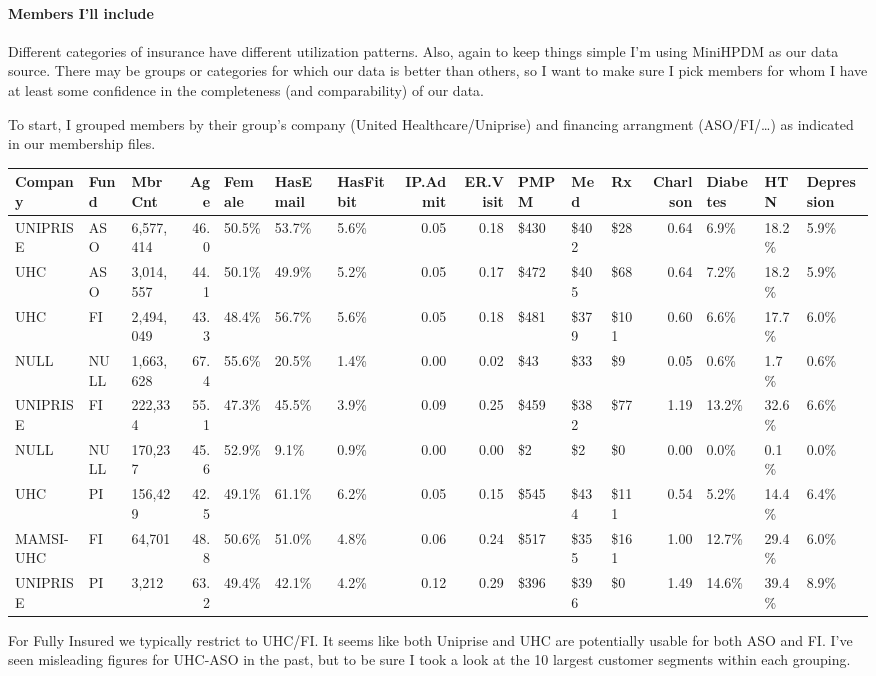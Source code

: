 \documentclass[]{article}
\let\oldparagraph\paragraph
\renewcommand{\paragraph}[1]{\oldparagraph{#1}\mbox{}}
\begin{document}
\paragraph{Members I'll include}\label{members-ill-include}

Different categories of insurance have different utilization patterns.
Also, again to keep things simple I'm using MiniHPDM as our data source.
There may be groups or categories for which our data is better than
others, so I want to make sure I pick members for whom I have at least
some confidence in the completeness (and comparability) of our data.

To start, I grouped members by their group's company (United
Healthcare/Uniprise) and financing arrangment (ASO/FI/\ldots{}) as
indicated in our membership files.

\begin{longtable}[]{@{}lllrlllrrlllrlll@{}}
\toprule
Company & Fund & MbrCnt & Age & Female & HasEmail & HasFitbit & IP.Admit
& ER.Visit & PMPM & Med & Rx & Charlson & Diabetes & HTN &
Depression\tabularnewline
\midrule
\endhead
UNIPRISE & ASO & 6,577,414 & 46.0 & 50.5\% & 53.7\% & 5.6\% & 0.05 &
0.18 & \$430 & \$402 & \$28 & 0.64 & 6.9\% & 18.2\% &
5.9\%\tabularnewline
UHC & ASO & 3,014,557 & 44.1 & 50.1\% & 49.9\% & 5.2\% & 0.05 & 0.17 &
\$472 & \$405 & \$68 & 0.64 & 7.2\% & 18.2\% & 5.9\%\tabularnewline
UHC & FI & 2,494,049 & 43.3 & 48.4\% & 56.7\% & 5.6\% & 0.05 & 0.18 &
\$481 & \$379 & \$101 & 0.60 & 6.6\% & 17.7\% & 6.0\%\tabularnewline
NULL & NULL & 1,663,628 & 67.4 & 55.6\% & 20.5\% & 1.4\% & 0.00 & 0.02 &
\$43 & \$33 & \$9 & 0.05 & 0.6\% & 1.7\% & 0.6\%\tabularnewline
UNIPRISE & FI & 222,334 & 55.1 & 47.3\% & 45.5\% & 3.9\% & 0.09 & 0.25 &
\$459 & \$382 & \$77 & 1.19 & 13.2\% & 32.6\% & 6.6\%\tabularnewline
NULL & NULL & 170,237 & 45.6 & 52.9\% & 9.1\% & 0.9\% & 0.00 & 0.00 &
\$2 & \$2 & \$0 & 0.00 & 0.0\% & 0.1\% & 0.0\%\tabularnewline
UHC & PI & 156,429 & 42.5 & 49.1\% & 61.1\% & 6.2\% & 0.05 & 0.15 &
\$545 & \$434 & \$111 & 0.54 & 5.2\% & 14.4\% & 6.4\%\tabularnewline
MAMSI-UHC & FI & 64,701 & 48.8 & 50.6\% & 51.0\% & 4.8\% & 0.06 & 0.24 &
\$517 & \$355 & \$161 & 1.00 & 12.7\% & 29.4\% & 6.0\%\tabularnewline
UNIPRISE & PI & 3,212 & 63.2 & 49.4\% & 42.1\% & 4.2\% & 0.12 & 0.29 &
\$396 & \$396 & \$0 & 1.49 & 14.6\% & 39.4\% & 8.9\%\tabularnewline
\bottomrule
\end{longtable}

For Fully Insured we typically restrict to UHC/FI. It seems like both
Uniprise and UHC are potentially usable for both ASO and FI. I've seen
misleading figures for UHC-ASO in the past, but to be sure I took a look
at the 10 largest customer segments within each grouping.
\end{document}
